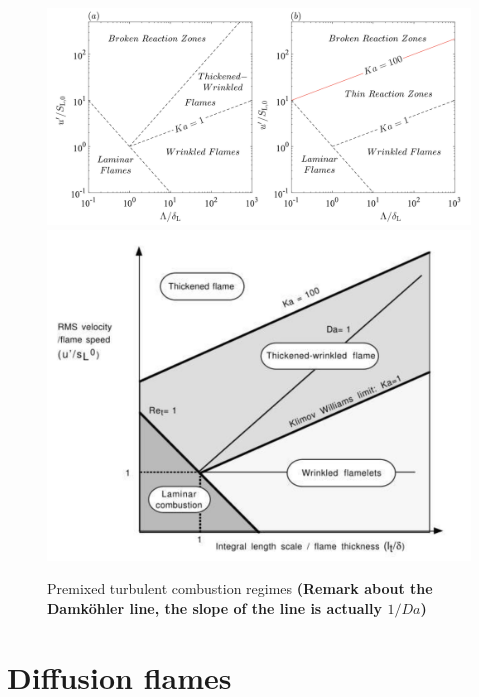 \documentclass[a4paper,11pt]{article}
\begin{document}
\begin{figure}[h!]
	\centering
	\includegraphics[width=\linewidth]{figures/diagram2.png}
	\includegraphics[width=.6\linewidth]{figures/diagram.png}
	\caption{Premixed turbulent combustion regimes \textbf{(Remark about the Damköhler line, the slope of the line is actually $1/Da$)}}
\end{figure}





\section{Diffusion flames}
\pagebreak











\appendix
\end{document}
